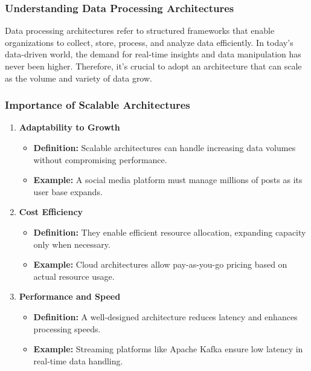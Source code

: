 \documentclass[aspectratio=169]{beamer}
\begin{document}
\frame{\titlepage}

\begin{frame}[fragile]
    \titlepage
\end{frame}

\begin{frame}[fragile]
    \frametitle{Understanding Data Processing Architectures}
    Data processing architectures refer to structured frameworks that enable organizations to collect, store, process, and analyze data efficiently. In today's data-driven world, the demand for real-time insights and data manipulation has never been higher. Therefore, it’s crucial to adopt an architecture that can scale as the volume and variety of data grow.
\end{frame}

\begin{frame}[fragile]
    \frametitle{Importance of Scalable Architectures}
    \begin{enumerate}
        \item \textbf{Adaptability to Growth}
            \begin{itemize}
                \item \textbf{Definition:} Scalable architectures can handle increasing data volumes without compromising performance.
                \item \textbf{Example:} A social media platform must manage millions of posts as its user base expands.
            \end{itemize}
        
        \item \textbf{Cost Efficiency}
            \begin{itemize}
                \item \textbf{Definition:} They enable efficient resource allocation, expanding capacity only when necessary.
                \item \textbf{Example:} Cloud architectures allow pay-as-you-go pricing based on actual resource usage.
            \end{itemize}

        \item \textbf{Performance and Speed}
            \begin{itemize}
                \item \textbf{Definition:} A well-designed architecture reduces latency and enhances processing speeds.
                \item \textbf{Example:} Streaming platforms like Apache Kafka ensure low latency in real-time data handling.
            \end{itemize}


\end{enumerate}
\end{frame}
\end{document}

